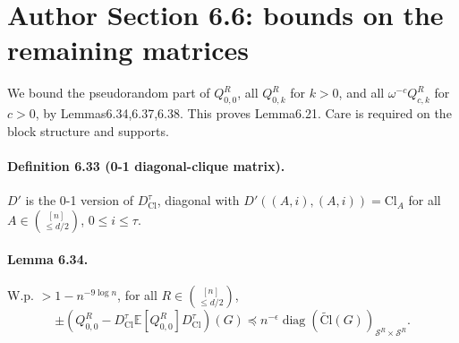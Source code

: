 \documentclass[10pt,a4paper]{article}
\begin{document}
\section*{Author Section 6.6: bounds on the remaining matrices}
We bound the pseudorandom part of $Q_{0,0}^R$, all $Q_{0,k}^R$ for $k>0$, and all $\omega^{-c}Q_{c,k}^R$ for $c>0$, by Lemmas6.34,6.37,6.38. This proves Lemma6.21. Care is required on the block structure and supports.
\paragraph{Definition 6.33 (0-1 diagonal-clique matrix).} $D'$ is the 0-1 version of $D_{\mathrm{Cl}}^\tau$, diagonal with $D'((A,i),(A,i))=\mathrm{Cl}_A$ for all $A\in\binom{[n]}{\le d/2}$, $0\le i\le\tau$.
\paragraph{Lemma 6.34.} W.p. $>1-n^{-9\log n}$, for all $R\in\binom{[n]}{\le d/2}$,
\[\pm(Q_{0,0}^R-D_{\mathrm{Cl}}^\tau\mathbb E[Q_{0,0}^R]D_{\mathrm{Cl}}^\tau)(G)\preceq n^{-\epsilon}\operatorname{diag}(\widetilde{\mathrm{Cl}}(G))_{\mathcal S^R\times\mathcal S^R}.\tag{6.65}\]
\end{document}
